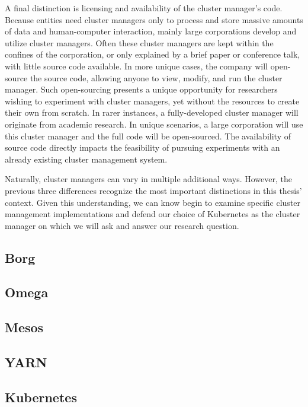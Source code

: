 \documentclass[twoside]{report}
\begin{document}
A final distinction is licensing and availability of the cluster manager's code.
Because entities need cluster managers only to process and store massive amounts
of data and human-computer interaction, mainly large
corporations develop and utilize cluster managers. Often these cluster
managers are kept within the confines of the corporation, or only explained by a
brief paper or conference talk, with little source code available. In more
unique cases, the company will open-source the source code, allowing anyone to
view, modify, and run the cluster manager. Such open-sourcing presents a unique opportunity
for researchers wishing to experiment with cluster managers, yet without the
resources to create their own from scratch. In rarer instances, a
fully-developed cluster manager will originate from academic research. In unique
scenarios, a large corporation will use this cluster manager and the full code will
be open-sourced. The availability of source code directly impacts the
feasibility of pursuing experiments with an already existing cluster management
system.

Naturally, cluster managers can vary in multiple additional ways. However,
the previous three differences recognize the most important distinctions in this
thesis' context. Given this understanding, we can know begin to examine specific
cluster management implementations and defend our choice of Kubernetes as the
cluster manager on which we will ask and answer our research question.

\subsection{Borg}

\subsection{Omega}

\subsection{Mesos}

\subsection{YARN}

\subsection{Kubernetes}
\end{document}
